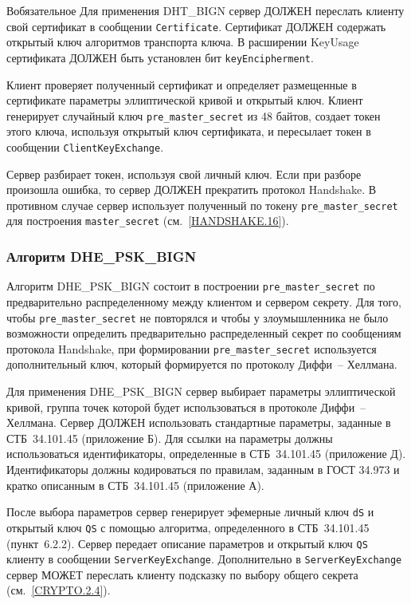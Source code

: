 \begin{appendix}{В}{обязательное}
Для применения DHT\_BIGN сервер ДОЛЖЕН переслать клиенту свой сертификат в 
сообщении \lstinline{Certificate}. Сертификат ДОЛЖЕН содержать открытый ключ 
алгоритмов транспорта ключа. В расширении KeyUsage сертификата ДОЛЖЕН быть 
установлен бит \lstinline{keyEncipherment}. 

Клиент проверяет полученный сертификат и определяет размещенные в 
сертификате параметры эллиптической кривой и открытый ключ. Клиент 
генерирует случайный ключ \lstinline{pre_master_secret} из 48 байтов, 
создает токен этого ключа, используя открытый ключ сертификата, и 
пересылает токен в сообщении \lstinline{ClientKeyExchange}.  

Сервер разбирает токен, используя свой личный ключ. Если при разборе 
произошла ошибка, то сервер ДОЛЖЕН прекратить протокол Handshake. В 
противном случае сервер использует полученный по токену 
\lstinline{pre_master_secret} для построения \lstinline{master_secret} 
(см.~\ref{HANDSHAKE.16}).  

\subsubsection{Алгоритм DHE\_PSK\_BIGN}\label{BSUITES.2.3.3}

Алгоритм DHE\_PSK\_BIGN состоит в построении \lstinline{pre_master_secret} по 
предварительно распределенному между клиентом и сервером секрету. Для 
того, чтобы \lstinline{pre_master_secret} не повторялся и чтобы у злоумышленника не 
было возможности определить предварительно распределенный секрет по 
сообщениям протокола Handshake, при формировании 
\lstinline{pre_master_secret} используется дополнительный ключ, который 
формируется по протоколу Диффи~-- Хеллмана.  

Для применения DHE\_PSK\_BIGN сервер выбирает параметры эллиптической 
кривой, группа точек которой будет использоваться в протоколе Диффи~-- 
Хеллмана. Сервер ДОЛЖЕН использовать стандартные параметры, заданные в 
СТБ~34.101.45 (приложение Б). Для ссылки на параметры должны использоваться  
идентификаторы, определенные в СТБ~34.101.45 (приложение Д). Идентификаторы 
должны кодироваться по правилам, заданным в ГОСТ 34.973 и кратко описанным 
в СТБ~34.101.45 (приложение А). 

После выбора параметров сервер генерирует эфемерные личный ключ \lstinline{dS} и 
открытый ключ \lstinline{QS} с помощью алгоритма, определенного в СТБ~34.101.45 
(пункт~6.2.2). Сервер передает описание параметров и открытый ключ 
\lstinline{QS} клиенту в сообщении \lstinline{ServerKeyExchange}. 
Дополнительно в \lstinline{ServerKeyExchange} сервер МОЖЕТ переслать 
клиенту подсказку по выбору общего секрета (см.~\ref{CRYPTO.2.4}).   


\end{appendix}
